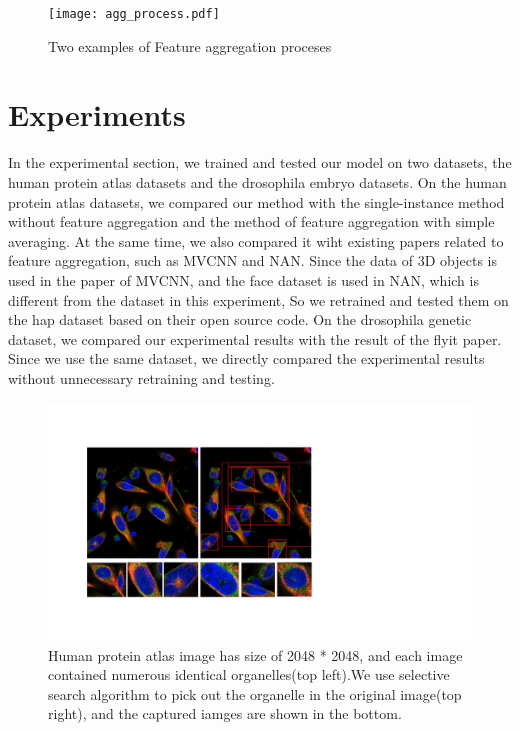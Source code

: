 \documentclass[10pt,twocolumn,letterpaper]{article}
\begin{document}
\begin{figure}[t]
\begin{center}
  \texttt{[image: agg\_process.pdf]}
\end{center}
  \caption{Two examples of Feature aggregation proceses}
\label{fig:long}
\label{fig:onecol}
\end{figure}


\section{Experiments}
In the experimental section, we trained and tested our model on two datasets, the human protein atlas datasets and the drosophila embryo datasets. On the human protein atlas datasets, we compared our method with the single-instance method without feature aggregation and the method of feature aggregation with simple averaging. At the same time, we also compared it wiht existing papers related to feature aggregation, such as MVCNN and NAN. Since the data of 3D objects is used in the paper of MVCNN, and the face dataset is used in NAN, which is different from the dataset in this experiment, So we retrained and tested them on the hap dataset based on their open source code. On the drosophila genetic dataset, we compared our experimental results with the result of the flyit paper. Since we use the same dataset, we directly compared the experimental results without unnecessary retraining and testing.


\begin{figure}[t]
\begin{center}
  \includegraphics[width=0.9\linewidth]{hpa.pdf}
\end{center}
  \caption{Human protein atlas image has size of 2048 * 2048, and each image contained numerous identical organelles(top left).We use selective search algorithm to pick out the organelle in the original image(top right), and the captured iamges are shown in the bottom.  }
\label{fig:long}
\label{fig:onecol}
\end{figure}
\end{document}
